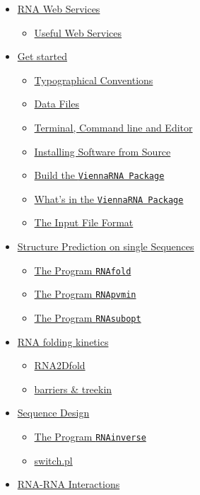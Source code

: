 \documentclass[]{article}
\providecommand{\tightlist}{%
  \setlength{\itemsep}{0pt}\setlength{\parskip}{0pt}}
\begin{document}
\begin{itemize}
\tightlist
\item
  \hyperref[sec1]{RNA Web Services{}}

  \begin{itemize}
  \tightlist
  \item
    \hyperref[sec1]{Useful Web Services}
  \end{itemize}
\item
  \hyperref[sec2]{Get started{}}

  \begin{itemize}
  \tightlist
  \item
    \hyperref[sec2ux5f1]{Typographical Conventions}
  \item
    \hyperref[sec2ux5f2]{Data Files}
  \item
    \hyperref[sec2ux5f3]{Terminal, Command line and Editor}
  \item
    \hyperref[sec2ux5f4]{Installing Software from Source}
  \item
    \hyperref[sec2ux5f5]{Build the \texttt{ViennaRNA\ Package}}
  \item
    \hyperref[sec2ux5f6]{What's in the \texttt{ViennaRNA\ Package}}
  \item
    \hyperref[sec2ux5f7]{The Input File Format}
  \end{itemize}
\item
  \hyperref[sec3]{Structure Prediction on single Sequences{}}

  \begin{itemize}
  \tightlist
  \item
    \hyperref[sec3ux5f1]{The Program \texttt{RNAfold}}
  \item
    \hyperref[sec3ux5f2]{The Program \texttt{RNApvmin}}
  \item
    \hyperref[sec3ux5f3]{The Program \texttt{RNAsubopt}}
  \end{itemize}
\item
  \hyperref[sec4]{RNA folding kinetics{}}

  \begin{itemize}
  \tightlist
  \item
    \hyperref[sec4ux5f1]{RNA2Dfold}
  \item
    \hyperref[sec4ux5f2]{barriers \& treekin}
  \end{itemize}
\item
  \hyperref[sec5]{Sequence Design{}}

  \begin{itemize}
  \tightlist
  \item
    \hyperref[sec5ux5f1]{The Program \texttt{RNAinverse}}
  \item
    \hyperref[sec5ux5f2]{switch.pl}
  \end{itemize}
\item
  \hyperref[sec6]{RNA-RNA Interactions{}}


\end{itemize}
\end{document}
